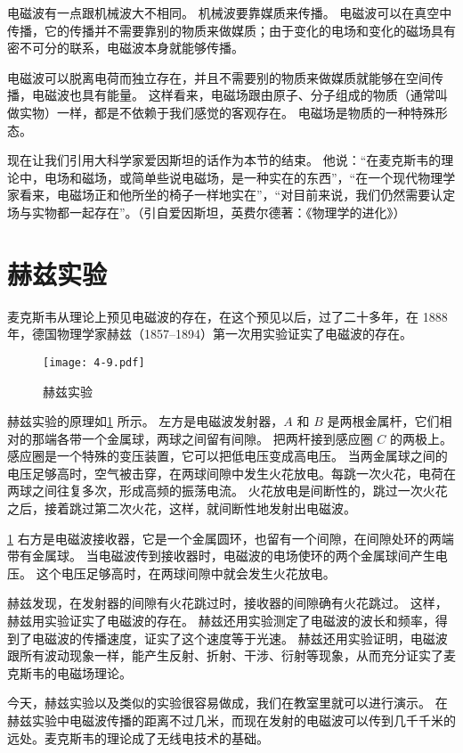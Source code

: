 电磁波有一点跟机械波大不相同。
机械波要靠媒质来传播。
电磁波可以在真空中传播，它的传播并不需要靠别的物质来做媒质；由于变化的电场和变化的磁场具有密不可分的联系，电磁波本身就能够传播。

电磁波可以脱离电荷而独立存在，并且不需要别的物质来做媒质就能够在空间传播，电磁波也具有能量。
这样看来，电磁场跟由原子、分子组成的物质（通常叫做实物）一样，都是不依赖于我们感觉的客观存在。
电磁场是物质的一种特殊形态。

现在让我们引用大科学家爱因斯坦的话作为本节的结束。
他说：“在麦克斯韦的理论中，电场和磁场，或简单些说电磁场，是一种实在的东西”，“在一个现代物理学家看来，电磁场正和他所坐的椅子一样地实在”，“对目前来说，我们仍然需要认定场与实物都一起存在”。（引自爱因斯坦，英费尔德著：《物理学的进化》）

\section{赫兹实验}
麦克斯韦从理论上预见电磁波的存在，在这个预见以后，过了二十多年，在 1888 年，德国物理学家赫兹（1857--1894）第一次用实验证实了电磁波的存在。

\begin{figure}
	\texttt{[image: 4-9.pdf]}
	\caption{赫兹实验}\label{fig:4-9}
\end{figure}

赫兹实验的原理如\cref{fig:4-9} 所示。
左方是电磁波发射器，$A$ 和 $B$ 是两根金属杆，它们相对的那端各带一个金属球，两球之间留有间隙。
把两杆接到感应圈 $C$ 的两极上。
感应圈是一个特殊的变压装置，它可以把低电压变成高电压。
当两金属球之间的电压足够高时，空气被击穿，在两球间隙中发生火花放电。每跳一次火花，电荷在两球之间往复多次，形成高频的振荡电流。
火花放电是间断性的，跳过一次火花之后，接着跳过第二次火花，这样，就间断性地发射出电磁波。

\cref{fig:4-9} 右方是电磁波接收器，它是一个金属圆环，也留有一个间隙，在间隙处环的两端带有金属球。
当电磁波传到接收器时，电磁波的电场使环的两个金属球间产生电压。
这个电压足够高时，在两球间隙中就会发生火花放电。

赫兹发现，在发射器的间隙有火花跳过时，接收器的间隙确有火花跳过。
这样，赫兹用实验证实了电磁波的存在。
赫兹还用实验测定了电磁波的波长和频率，得到了电磁波的传播速度，证实了这个速度等于光速。
赫兹还用实验证明，电磁波跟所有波动现象一样，能产生反射、折射、干涉、衍射等现象，从而充分证实了麦克斯韦的电磁场理论。

今天，赫兹实验以及类似的实验很容易做成，我们在教室里就可以进行演示。
在赫兹实验中电磁波传播的距离不过几米，而现在发射的电磁波可以传到几千千米的远处。麦克斯韦的理论成了无线电技术的基础。

